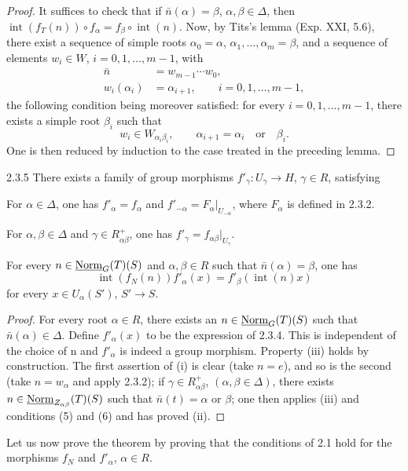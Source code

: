 \begin{proof}
It suffices to check that if $\bar n(\alpha)=\beta$, $\alpha,\beta\in\Delta$, then $\operatorname{int}(f_T(n))\circ f_\alpha=f_\beta\circ\operatorname{int}(n)$. Now, by Tits's lemma (Exp. XXI, 5.6), there exist a sequence of simple roots $\alpha_0=\alpha$, $\alpha_1,\ldots,\alpha_m=\beta$, and a sequence of elements $w_i\in W$, $i=0,1,\ldots,m-1$, with
\[
\begin{aligned}
\bar n&=w_{m-1}\cdots w_0,\\
w_i(\alpha_i)&=\alpha_{i+1},\qquad i=0,1,\ldots,m-1,
\end{aligned}
\]
the following condition being moreover satisfied: for every $i=0,1,\ldots,m-1$, there exists a simple root $\beta_i$ such that
\[
w_i\in W_{\alpha_i\beta_i},\qquad\alpha_{i+1}=\alpha_i\quad\text{or}\quad\beta_i.
\]
One is then reduced by induction to the case treated in the preceding lemma.
\end{proof}
\begin{lemma}{2.3.5}\label{XXIII.2.3.5}
There exists a family of group morphisms $f'_\gamma:U_\gamma\to H$, $\gamma\in R$, satisfying
\begin{enumeratei}
\item For $\alpha\in\Delta$, one has $f'_\alpha=f_\alpha$ and $f'_{-\alpha}=F_\alpha|_{U_{-\alpha}}$, where $F_\alpha$ is defined in 2.3.2.
\item For $\alpha,\beta\in\Delta$ and $\gamma\in R^+_{\alpha\beta}$, one has $f'_\gamma=f_{\alpha\beta}|_{U_\gamma}$.
\item For every $n\in\underline{\mathrm{Norm}}_G(T)(S)$ and $\alpha,\beta\in R$ such that $\bar n(\alpha)=\beta$, one has
\[
\operatorname{int}(f_N(n))f'_\alpha(x)=f'_\beta(\operatorname{int}(n)x)
\]
for every $x\in U_\alpha(S')$, $S'\to S$.
\end{enumeratei}
\end{lemma}
\begin{proof}
For every root $\alpha\in R$, there exists an $n\in\underline{\mathrm{Norm}}_G(T)(S)$ such that $\bar n(\alpha)\in\Delta$. Define $f'_\alpha(x)$ to be the expression of 2.3.4. This is independent of the choice of n and $f'_\alpha$ is indeed a group morphism. Property (iii) holds by construction. The first assertion of (i) is clear (take $n=e$), and so is the second (take $n=w_\alpha$ and apply 2.3.2); if $\gamma\in R^+_{\alpha\beta}$, $(\alpha,\beta\in\Delta)$, there exists $n\in\underline{\mathrm{Norm}}_{Z_{\alpha\beta}}(T)(S)$ such that $\bar n(t)=\alpha$ or $\beta$; one then applies (iii) and conditions (5) and (6) and has proved (ii).
\end{proof}
Let us now prove the theorem by proving that the conditions of 2.1 hold for the morphisms $f_N$ and $f'_\alpha$, $\alpha\in R$.

